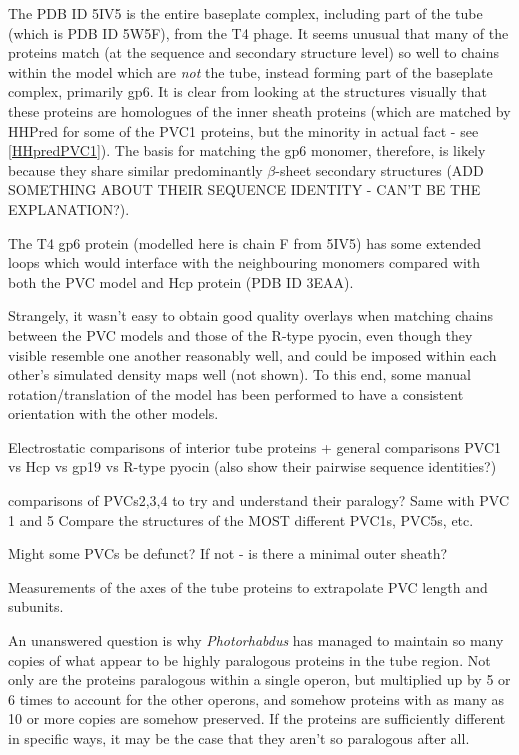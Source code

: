 The PDB ID 5IV5 is the entire baseplate complex, including part of the tube (which is PDB ID 5W5F), from the T4 phage. It seems unusual that many of the proteins match (at the sequence and secondary structure level) so well to chains within the model which are \emph{not} the tube, instead forming part of the baseplate complex, primarily gp6. It is clear from looking at the structures visually that these proteins are homologues of the inner sheath proteins (which are matched by HHPred for some of the PVC1 proteins, but the minority in actual fact - see \vref{HHpredPVC1}). The basis for matching the gp6 monomer, therefore, is likely because they share similar predominantly $\beta$-sheet secondary structures (ADD SOMETHING ABOUT THEIR SEQUENCE IDENTITY - CAN'T BE THE EXPLANATION?).

The T4 gp6 protein (modelled here is chain F from 5IV5) has some extended loops which would interface with the neighbouring monomers compared with both the PVC model and Hcp protein (PDB ID 3EAA). 

Strangely, it wasn't easy to obtain good quality overlays when matching chains between the PVC models and those of the R-type pyocin, even though they visible resemble one another reasonably well, and could be imposed within each other's simulated density maps well (not shown). To this end, some manual rotation/translation of the model has been performed to have a consistent orientation with the other models.

Electrostatic comparisons of interior tube proteins + general comparisons
PVC1 vs Hcp vs gp19 vs R-type pyocin (also show their pairwise sequence identities?)

comparisons of PVCs2,3,4 to try and understand their paralogy? Same with PVC 1 and 5
Compare the structures of the MOST different PVC1s, PVC5s, etc.

Might some PVCs be defunct? If not - is there a minimal outer sheath?

Measurements of the axes of the tube proteins to extrapolate PVC length and subunits.


An unanswered question is why \emph{Photorhabdus} has managed to maintain so many copies of what appear to be highly paralogous proteins in the tube region. Not only are the proteins paralogous within a single operon, but multiplied up by 5 or 6 times to account for the other operons, and somehow proteins with as many as 10 or more copies are somehow preserved. If the proteins are sufficiently different in specific ways, it may be the case that they aren't so paralogous after all. 


